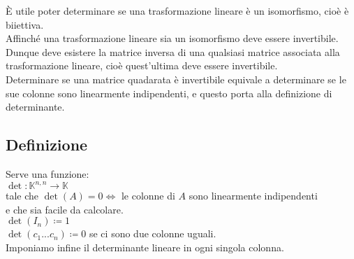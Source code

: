 \documentclass[a4paper, twoside, italian, 11pt]{book}
\newcommand{\K}{\mathbb K}
\begin{document}
È utile poter determinare se una trasformazione lineare è un isomorfismo, cioè è biiettiva. \\

\noindent
Affinché una trasformazione lineare sia un isomorfismo deve essere invertibile. \\

\noindent
Dunque deve esistere la matrice inversa di una qualsiasi matrice associata alla trasformazione lineare, cioè quest'ultima deve essere invertibile. \\

\noindent
Determinare se una matrice quadarata è invertibile equivale a determinare se le sue colonne sono linearmente indipendenti, e questo porta alla definizione di determinante. \\


\subsection{Definizione}

Serve una funzione: \\

$\det : \K^{n,n} \rightarrow \K$ \\

\noindent
tale che $\det(A) = 0 \iff$ le colonne di $A$ sono linearmente indipendenti \\

\noindent
e che sia facile da calcolare. \\

$\det(I_n) \coloneqq 1$ \\

$\det(c_1 ... c_n) \coloneqq 0$ se ci sono due colonne uguali. \\ %

Imponiamo infine il determinante lineare in ogni singola colonna. %
\end{document}
